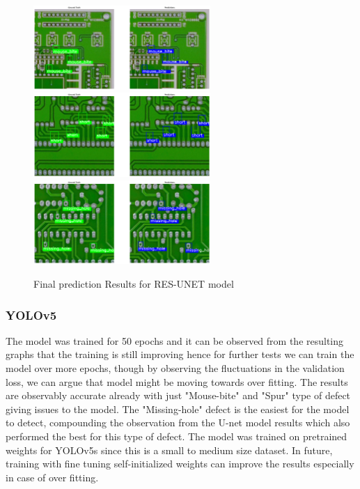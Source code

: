 \documentclass[12pt]{article}
\begin{document}
\begin{figure}[h]
    \centering
    \includegraphics[width=0.6\textwidth]{./graphics/results1_resunet.png}
    \includegraphics[width=0.6\textwidth]{./graphics/results2_resunet.png}
    \includegraphics[width=0.6\textwidth]{./graphics/results3_resunet.png}

    \caption{Final prediction Results for RES-UNET model}
    \label{fig:finalpred1_unet}
\end{figure}

\clearpage
\newpage

\subsubsection{YOLOv5}
The model was trained for 50 epochs and it can be observed from the resulting graphs that the training is still improving hence for further tests we can train the model over more epochs, though by observing the fluctuations in the validation loss, we can argue that model might be moving towards over fitting. The results are observably accurate already with just "Mouse-bite" and "Spur" type of defect giving issues to the model. The "Missing-hole" defect is the easiest for the model to detect, compounding the observation from the U-net model results which also performed the best for this type of defect.
The model was trained on pretrained weights for YOLOv5s since this is a small to medium size dataset. In future, training with fine tuning self-initialized weights can improve the results especially in case of over fitting.
\end{document}
